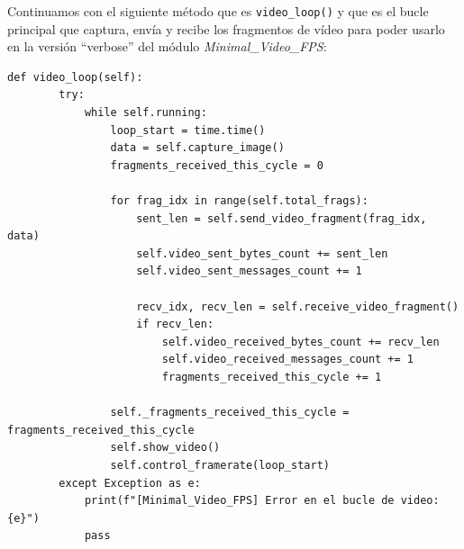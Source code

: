 Continuamos con el siguiente método que es \texttt{video\_loop()} y que es el bucle principal que captura, envía y recibe los fragmentos de vídeo para poder usarlo en la versión ``verbose'' del módulo \textit{Minimal\_Video\_FPS}:
\begin{lstlisting}[style=pythonstyle, caption={Método \texttt{video\_loop()}.}, label={lst:video_loop_verbose}]
def video_loop(self):
        try:
            while self.running:
                loop_start = time.time()
                data = self.capture_image()
                fragments_received_this_cycle = 0

                for frag_idx in range(self.total_frags):
                    sent_len = self.send_video_fragment(frag_idx, data)
                    self.video_sent_bytes_count += sent_len
                    self.video_sent_messages_count += 1

                    recv_idx, recv_len = self.receive_video_fragment()
                    if recv_len:
                        self.video_received_bytes_count += recv_len
                        self.video_received_messages_count += 1
                        fragments_received_this_cycle += 1

                self._fragments_received_this_cycle = fragments_received_this_cycle
                self.show_video()
                self.control_framerate(loop_start)
        except Exception as e:
            print(f"[Minimal_Video_FPS] Error en el bucle de video: {e}")
            pass
\end{lstlisting}
\vspace{\baselineskip}

